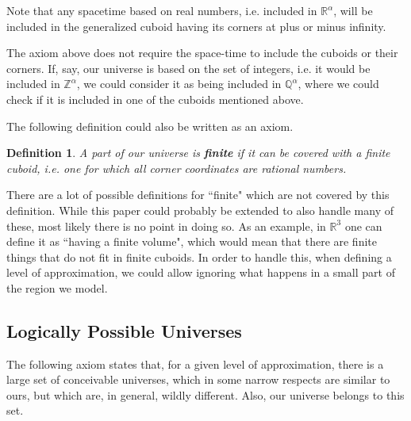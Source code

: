 \documentclass[a4paper
,draft
]{article}
\def\reale{\mathbb{R}}
\def\intregi{\mathbb{Z}}
\def\rationale{\mathbb{Q}}
\newcommand{\definitie}[1]{\textbf{#1}}
\newcommand{\ghilimele}[1]{``#1"}
\newtheorem{definition}{Definition}
\begin{document}
Note that any spacetime based on real numbers, i.e. included
in $\reale^\alpha$, will be included in the generalized cuboid having
its corners at plus or minus infinity.

The axiom above does not require the space-time to include the cuboids or
their corners.
If, say, our universe is based on the set of integers, i.e.
it would be included in $\intregi^\alpha$,
we could consider it as being included in $\rationale^\alpha$,
where we could check if it is included in one of the cuboids mentioned
above.

The following definition could also be written as an axiom.

\begin{definition}\label{finitecuboid}
  A part of our universe is \definitie{finite} if
  it can be covered with a finite cuboid, i.e. one
  for which all corner coordinates are rational numbers.
\end{definition}

There are a lot of possible definitions for \ghilimele{finite} which are not
covered by this definition.
While this paper could probably be extended to also handle many of these,
most likely there is no point in doing so.
As an example, in $\reale^3$ one can define it as
\ghilimele{having a finite volume}, which would
mean that there are finite things that do not fit in finite cuboids.
In order to handle this, when defining a level of approximation,
we could allow ignoring what happens in a small part of the region we model.

\subsection{Logically Possible Universes}

The following axiom states that, for a given level of approximation,
there is a large set of conceivable universes, which in some narrow respects
are similar to ours, but which are, in general, wildly different.
Also, our universe belongs to this set.
\end{document}
